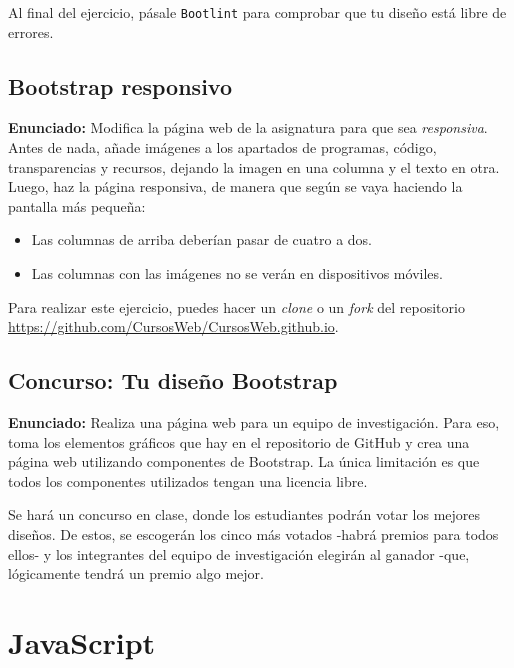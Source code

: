Al final del ejercicio, pásale \texttt{Bootlint} para comprobar que tu diseño está libre
de errores.

\subsection{Bootstrap responsivo}
\label{subsec:bootstrap-responsivo}

\textbf{Enunciado:} Modifica la página web de la asignatura para que sea \emph{responsiva}. Antes de nada, añade imágenes a los apartados de programas, código, transparencias y recursos, dejando la imagen en una columna y el texto en otra. Luego, haz la página responsiva, de manera que según se vaya haciendo la pantalla más pequeña:

\begin{itemize}
  \item Las columnas de arriba deberían pasar de cuatro a dos.
  \item Las columnas con las imágenes no se verán en dispositivos móviles.
\end{itemize}
   
   Para realizar este ejercicio, puedes hacer un \emph{clone} o un \emph{fork} del
repositorio \url{https://github.com/CursosWeb/CursosWeb.github.io}.

\subsection{Concurso: Tu diseño Bootstrap}
\label{subsec:concurso-bootstrap}

\textbf{Enunciado:} Realiza una página web para un equipo de investigación.
Para eso, toma los elementos gráficos que hay en el repositorio de
GitHub y crea una página web utilizando componentes de Bootstrap. La única
limitación es que todos los componentes utilizados tengan una licencia libre.

Se hará un concurso en clase, donde los estudiantes podrán votar los mejores
diseños. De estos, se escogerán los cinco más votados -habrá premios para todos
ellos- y los integrantes del equipo de investigación elegirán al ganador -que,
lógicamente tendrá un premio algo mejor.

\section{JavaScript}

